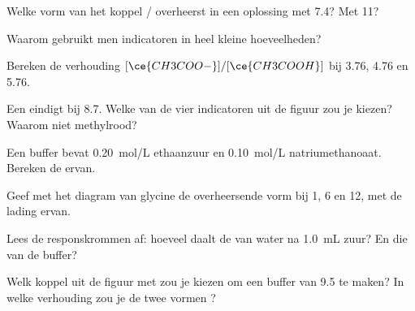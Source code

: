\begin{exercise}[$\star$]\label{exo:g12:buffers-predominance:4}
Welke vorm van het koppel / overheerst in een oplossing
met  7.4? Met  11?
\end{exercise}

\begin{exercise}[$\star$]\label{exo:g12:buffers-predominance:5}
Waarom gebruikt men indicatoren in heel kleine hoeveelheden?
\end{exercise}

\begin{exercise}[$\star\star$]\label{exo:g12:buffers-predominance:6}
Bereken de verhouding $[\ce{CH3COO-}]/[\ce{CH3COOH}]$ bij  3.76, 4.76 en
5.76.
\end{exercise}

\begin{exercise}[$\star\star$]\label{exo:g12:buffers-predominance:7}
Een  eindigt bij  8.7. Welke van de vier indicatoren uit de
figuur zou je kiezen? Waarom niet methylrood?
\end{exercise}

\begin{exercise}[$\star\star$]\label{exo:g12:buffers-predominance:8}
Een buffer bevat \qty{0.20}{mol/L} ethaanzuur en \qty{0.10}{mol/L}
natriumethanoaat. Bereken de  ervan.
\end{exercise}

\begin{exercise}[$\star\star$]\label{exo:g12:buffers-predominance:9}
Geef met het diagram van glycine de overheersende vorm bij  1, 6 en 12,
met de lading ervan.
\end{exercise}

\begin{exercise}[$\star\star$]\label{exo:g12:buffers-predominance:10}
Lees de responskrommen af: hoeveel daalt de  van water na
\qty{1.0}{mL} zuur? En die van de buffer?
\end{exercise}

\begin{exercise}[$\star\star$]\label{exo:g12:buffers-predominance:11}
Welk koppel uit de figuur met  zou je kiezen om een
buffer van  9.5 te maken? In welke verhouding zou je de twee vormen
?
\end{exercise}

